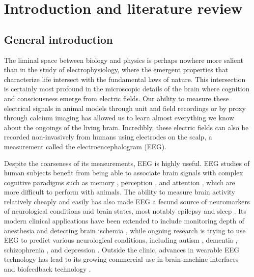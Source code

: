 \chapter{Introduction and literature review} \label{sec:intro}


\section{General introduction}

The liminal space between biology and physics is perhaps nowhere more salient than in the study of electrophysiology, where the emergent properties that characterize life intersect with the fundamental laws of nature. This intersection is certainly most profound in the microscopic details of the brain where cognition and consciousness emerge from electric fields. Our ability to measure these electrical signals in animal models through unit and field recordings or by proxy through calcium imaging has allowed us to learn almost everything we know about the ongoings of the living brain. Incredibly, these electric fields can also be recorded non-invasively from humans using electrodes on the scalp, a measurement called the electroencephalogram (EEG). 

Despite the coarseness of its measurements, EEG is highly useful. EEG studies of human subjects benefit from being able to associate brain signals with complex cognitive paradigms such as memory \cite{Osipova2006, Sauseng2009, Sauseng2010}, perception \cite{Rodriguez1999, Melloni2007,Fahrenfort2012}, and attention \cite{Hillyard1998, Makeig2002}, which are more difficult to perform with animals. The ability to measure brain activity relatively cheaply and easily has also made EEG a fecund source of neuromarkers of neurological conditions and brain states, most notably epilepsy \cite{Engel1984,Noachtar2009} and sleep \cite{Wolpert1969, Prerau2016}. Its modern clinical applications have been extended to include monitoring depth of anesthesia \cite{Michael2008} and detecting brain ischemia \cite{Meghdadi2021}, while ongoing research is trying to use EEG to predict various neurological conditions, including autism \cite{Bosl2018}, dementia \cite{Meghdadi2021}, schizophrenia \cite{Meghdadi2021}, and depression \cite{DeAguiarNeto2019}. Outside the clinic, advances in wearable EEG technology has lead to its growing commercial use in brain-machine interfaces \cite{Mahmood2021} and biofeedback technology \cite{Hunkin2021}. 

